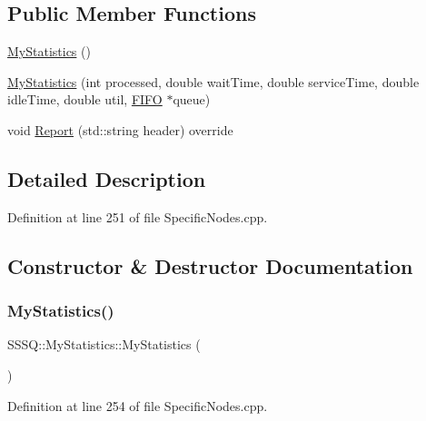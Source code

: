 \subsection*{Public Member Functions}
\begin{DoxyCompactItemize}
\item 
\hyperlink{class_s_s_s_q_1_1_my_statistics_ac80e1e32d280054d066816e517303afe}{My\+Statistics} ()
\item 
\hyperlink{class_s_s_s_q_1_1_my_statistics_af2e9214ebae8b846ae9beefbfb65f3de}{My\+Statistics} (int processed, double wait\+Time, double service\+Time, double idle\+Time, double util, \hyperlink{class_f_i_f_o}{F\+I\+FO} $\ast$queue)
\item 
void \hyperlink{class_s_s_s_q_1_1_my_statistics_a6dec552109226c307ffbb81f45ec3eb9}{Report} (std\+::string header) override
\end{DoxyCompactItemize}


\subsection{Detailed Description}


Definition at line 251 of file Specific\+Nodes.\+cpp.



\subsection{Constructor \& Destructor Documentation}
\mbox{\label{class_s_s_s_q_1_1_my_statistics_ac80e1e32d280054d066816e517303afe}} 
\subsubsection{\texorpdfstring{My\+Statistics()}{MyStatistics()}\hspace{0.1cm}{\footnotesize\ttfamily [1/2]}}
{\footnotesize\ttfamily S\+S\+S\+Q\+::\+My\+Statistics\+::\+My\+Statistics (\begin{DoxyParamCaption}{ }\end{DoxyParamCaption})\hspace{0.3cm}{\ttfamily [inline]}}



Definition at line 254 of file Specific\+Nodes.\+cpp.

